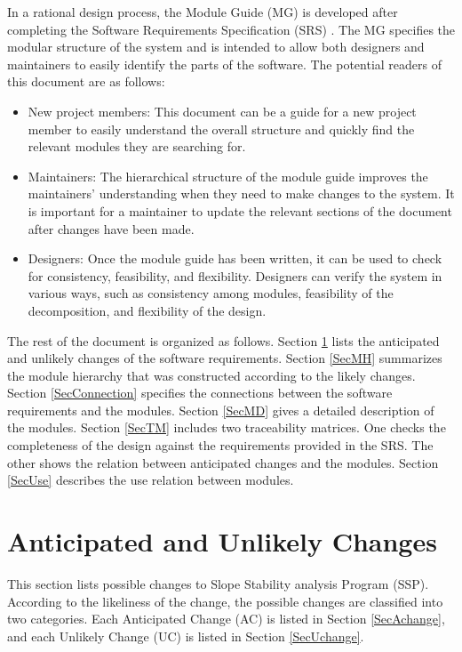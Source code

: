 \documentclass[12pt, titlepage]{article}
\newcommand{\progname}{SSP}
\begin{document}
In a rational design process, the Module Guide (MG) is developed after 
completing the Software Requirements Specification (SRS) 
\citep{ParnasEtAl1984}. The MG specifies the modular
structure of the system and is intended to allow both designers and
maintainers to easily identify the parts of the software.  The
potential readers of this document are as follows:

\begin{itemize}
\item New project members: This document can be a guide for a new
  project member to easily understand the overall structure and
  quickly find the relevant modules they are searching for.
\item Maintainers: The hierarchical structure of the module guide
  improves the maintainers' understanding when they need to make
  changes to the system. It is important for a maintainer to update
  the relevant sections of the document after changes have been made.
\item Designers: Once the module guide has been written, it can be
  used to check for consistency, feasibility, and flexibility. Designers can 
  verify the system in various ways, such as consistency among modules, 
  feasibility of the decomposition, and flexibility of the design.
\end{itemize}

The rest of the document is organized as follows. Section
\ref{SecChange} lists the anticipated and unlikely changes of the
software requirements. Section \ref{SecMH} summarizes the module
hierarchy that was constructed according to the likely
changes. Section \ref{SecConnection} specifies the connections between
the software requirements and the modules. Section \ref{SecMD} gives a
detailed description of the modules. Section \ref{SecTM} includes two
traceability matrices. One checks the completeness of the design
against the requirements provided in the SRS. The other shows the
relation between anticipated changes and the modules. Section
\ref{SecUse} describes the use relation between modules.

\section{Anticipated and Unlikely Changes} \label{SecChange}

\hspace{3ex}This section lists possible changes to Slope Stability analysis 
Program (\progname{}). According to the likeliness of the change, the possible
changes are classified into two categories. Each Anticipated Change (AC) is
listed in Section \ref{SecAchange}, and each Unlikely Change (UC) is listed in
Section \ref{SecUchange}.
\end{document}
